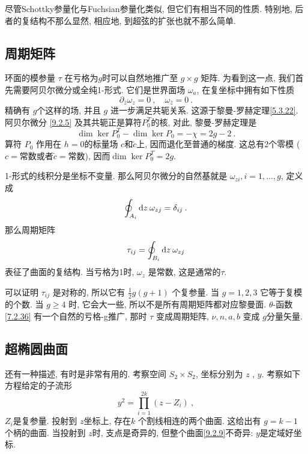 尽管Schottky参量化与Fuchsian参量化类似, 但它们有相当不同的性质. 特别地, 后者的复结构不那么显然, 相应地, 到超弦的扩张也就不那么简单.

\subsection*{周期矩阵}
环面的模参量 $\tau$ 在亏格为$g$时可以自然地推广至 $g \times g$ 矩阵. 为看到这一点, 我们首先需要阿贝尔微分或全纯1-形式. 
它们是世界面场 $\omega_{a}$, 在复坐标中拥有如下性质
\begin{equation}
	\partial_{\bar{z}} \omega_{z} = 0 \:, \quad \omega_{\bar{z}} = 0 \:. \label{9.2.5}
\end{equation}
精确有 $g$个这样的场, 并且 $g$ 进一步满足共轭关系. 这源于黎曼-罗赫定理\eqref{5.3.22}. 阿贝尔微分 \eqref{9.2.5} 及其共轭正是算符$P_{0}^{T}$的核, 
对此, 黎曼-罗赫定理是
\begin{equation}
	\operatorname{dim} \operatorname{ker} P_{0}^{T}-\operatorname{dim} \operatorname{ker} P_{0}=-\chi=2 g-2 \:. \label{9.2.6}
\end{equation}
算符 $P_{0}$ 作用在 $h=0$的标量场 $c$和$\tilde{c}$上, 因而退化至普通的梯度. 这总有2个零模 ($c=$常数或者$\tilde{c}=$常数), 
因而$\operatorname{dim}\operatorname{ker}P_{0}^{T}=2 g$.

1-形式的线积分是坐标不变量. 那么阿贝尔微分的自然基就是 $\omega_{z i}, i=1, \ldots, g$, 定义成
\begin{equation}
	\oint_{A_{i}} \mathrm{d} z \: \omega_{z j}=\delta_{i j} \:. \label{9.2.7}
\end{equation}
那么周期矩阵
\begin{equation}
	\tau_{i j}=\oint_{B_{i}} \mathrm{d} z\: \omega_{z j} \label{9.2.8}
\end{equation}
表征了曲面的复结构. 当亏格为1时, $\omega_{z}$ 是常数, 这是通常的$\tau$.

可以证明 $\tau_{ij}$ 是对称的, 所以它有 $\frac{1}{2} g(g+1)$ 个复参量. 当 $g=1,2,3$ 它等于复模的个数. 
当 $g \geq 4$ 时, 它会大一些, 所以不是所有周期矩阵都对应黎曼面. $\theta$-函数 \eqref{7.2.36} 有一个自然的亏格-g推广, 
那时 $\tau$ 变成周期矩阵,  $\nu, n, a, b$ 变成 $g$分量矢量.

\subsection*{超椭圆曲面}

还有一种描述, 有时是非常有用的. 考察空间 $S_{2} \times S_{2}$, 坐标分别为 $z$ ,  $y$. 考察如下方程给定的子流形
\begin{equation}
	y^{2}=\prod_{i=1}^{2 k}(z-Z_{i}) \:, \label{9.2.9}
\end{equation}
$Z_{i} $是复参量. 投射到 $z$坐标上, 存在$k$ 个割线相连的两个曲面. 这给出有 $g=k-1$ 个柄的曲面. 当投射到 $z$时, 支点是奇异的, 
但整个曲面\eqref{9.2.9}不奇异: $y$是定域好坐标.

